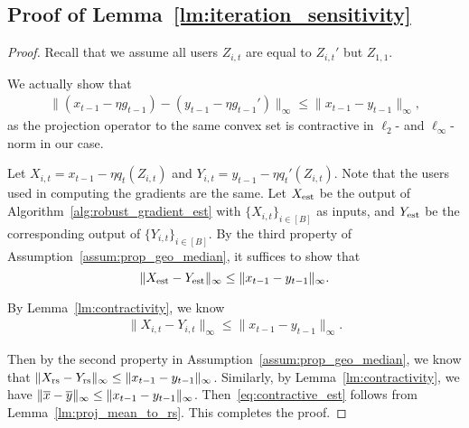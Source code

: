 \subsection{Proof of Lemma~\ref{lm:iteration_sensitivity}}
\iterationsensitivity*
\begin{proof}
Recall that we assume all users $Z_{i,t}$ are equal to $Z_{i,t}'$ but $Z_{1,1}$.

We actually show that 
\begin{align*}
    \|(x_{t-1}-\eta g_{t-1}) - (y_{t-1}-\eta g_{t-1}')\|_\infty\le \|x_{t-1}-y_{t-1}\|_\infty,
\end{align*}
as the projection operator to the same convex set is contractive in $\ell_2$- and $\ell_\infty$-norm in our case.

Let $X_{i,t}=x_{t-1}-\eta q_t(Z_{i,t})$ and $Y_{i,t}=y_{t-1}-\eta q_t'(Z_{i,t})$. Note that the users used in computing the gradients are the same.
Let $X_{\operatorname{est}}$ be the output of Algorithm~\ref{alg:robust_gradient_est} with $\{X_{i,t}\}_{i\in[B]}$ as inputs, and $Y_{\operatorname{est}}$ be the corresponding output of $\{Y_{i,t}\}_{i\in[B]}$.
By the third property of Assumption~\ref{assum:prop_geo_median}, it suffices to show that 
\begin{equation}
\label{eq:contractive_est}
    \|X_{\operatorname{est}}-Y_{\operatorname{est}}\|_\infty\le \|x_{t-1}-y_{t-1}\|_\infty.
\end{equation}

By Lemma~\ref{lm:contractivity}, we know 
\begin{align*}
    \|X_{i,t}-Y_{i,t}\|_\infty\le \|x_{t-1}-y_{t-1}\|_\infty.
\end{align*}

Then by the second property in Assumption~\ref{assum:prop_geo_median}, we know that $\|X_{\mathrm{rs}}-Y_{\mathrm{rs}}\|_\infty\le \|x_{t-1}-y_{t-1}\|_\infty$.
Similarly, by Lemma~\ref{lm:contractivity}, we have $\|\overline{x}-\overline{y}\|_\infty\le \|x_{t-1}-y_{t-1}\|_\infty$.
Then~\eqref{eq:contractive_est} follows from Lemma~\ref{lm:proj_mean_to_rs}.
This completes the proof.
\end{proof}


